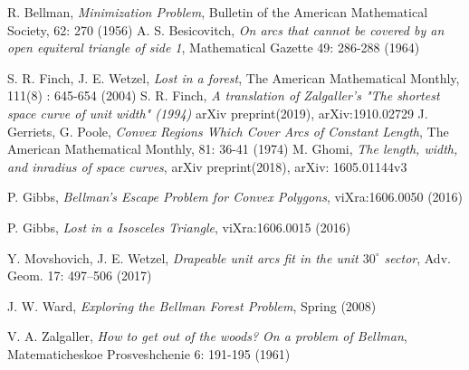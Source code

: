 \documentclass[11pt]{article}
\begin{document}
\begin{thebibliography}{99}


	R. Bellman,
	\textit{Minimization Problem},
	Bulletin of the American Mathematical Society, 62: 270  (1956)
	A. S. Besicovitch,
	\textit{On arcs that cannot be covered by an open equiteral triangle of side 1},
	Mathematical Gazette 49: 286-288 (1964)

	S. R. Finch, J. E. Wetzel,
	\textit{Lost in a forest},
	The American Mathematical Monthly, 111(8) : 645-654 (2004)
	S. R. Finch,
	\textit{A translation of Zalgaller's "The shortest space curve of unit width" (1994)}
	arXiv preprint(2019), arXiv:1910.02729
	J. Gerriets, G. Poole,
	\textit{Convex Regions Which Cover Arcs of Constant Length},
	The American Mathematical Monthly, 81: 36-41 (1974)
 	M. Ghomi,
	\textit{The length, width, and inradius of space curves},
	arXiv preprint(2018), arXiv: 1605.01144v3



	P. Gibbs, 
	\textit{Bellman’s Escape Problem for Convex Polygons},
	viXra:1606.0050 (2016)

	P. Gibbs,
	\textit{Lost in a Isosceles Triangle},
	viXra:1606.0015 (2016)

	Y. Movshovich, J. E. Wetzel,
	\textit{Drapeable unit arcs fit in the unit $30^\circ$ sector},
	 Adv. Geom. 17: 497–506 (2017)

    J. W. Ward,
    \textit{Exploring the Bellman Forest Problem},
    Spring (2008)

	V. A. Zalgaller,
	\textit{How to get out of the woods? On a problem of Bellman},
	Matematicheskoe Prosveshchenie 6: 191-195 (1961)


\end{thebibliography}
\end{document}
